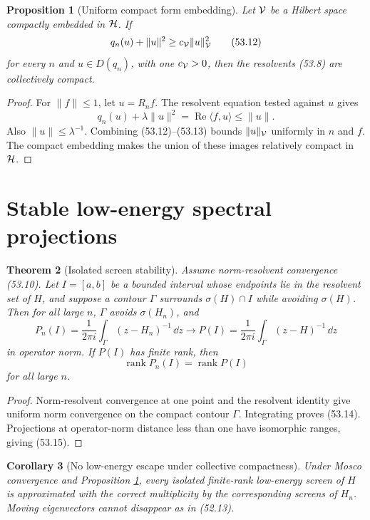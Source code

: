 \documentclass[11pt]{article}
\newtheorem{theorem}{Theorem}[section]
\newtheorem{proposition}[theorem]{Proposition}
\newtheorem{corollary}[theorem]{Corollary}
\theoremstyle{remark}
\begin{document}
\begin{proposition}[Uniform compact form embedding]
\label{prop:v15v53-compact-embedding}
Let \({\cal V}\) be a Hilbert space compactly embedded in
\({\cal H}\).  If
\[
 q_n(u)+\|u\|^2\geq c_{\cal V}\|u\|_{\cal V}^2          \tag{53.12}
\]
for every \(n\) and \(u\in D(q_n)\), with one
\(c_{\cal V}>0\), then the resolvents (53.8) are collectively
compact.
\end{proposition}

\begin{proof}
For \(\|f\|\leq1\), let \(u=R_nf\).  The resolvent equation tested
against \(u\) gives
\[
 q_n(u)+\lambda\|u\|^2
 =\operatorname{Re}\langle f,u\rangle
 \leq\|u\|.                                             \tag{53.13}
\]
Also \(\|u\|\leq\lambda^{-1}\).  Combining (53.12)--(53.13)
bounds \(\|u\|_{\cal V}\) uniformly in \(n\) and \(f\).
The compact embedding makes the union of these images relatively
compact in \({\cal H}\).
\end{proof}

\section{Stable low-energy spectral projections}

\begin{theorem}[Isolated screen stability]
\label{thm:v15v53-screen}
Assume norm-resolvent convergence (53.10).  Let
\(I=[a,b]\) be a bounded interval whose endpoints lie in the
resolvent set of \(H\), and suppose a contour \(\Gamma\) surrounds
\(\sigma(H)\cap I\) while avoiding \(\sigma(H)\).  Then for all
large \(n\), \(\Gamma\) avoids \(\sigma(H_n)\), and
\[
 P_n(I)=\frac1{2\pi i}\int_\Gamma(z-H_n)^{-1}\,\dd z
 \longrightarrow
 P(I)=\frac1{2\pi i}\int_\Gamma(z-H)^{-1}\,\dd z         \tag{53.14}
\]
in operator norm.  If \(P(I)\) has finite rank, then
\[
 \operatorname{rank}P_n(I)=\operatorname{rank}P(I)      \tag{53.15}
\]
for all large \(n\).
\end{theorem}

\begin{proof}
Norm-resolvent convergence at one point and the resolvent identity
give uniform norm convergence on the compact contour \(\Gamma\).
Integrating proves (53.14).  Projections at operator-norm distance
less than one have isomorphic ranges, giving (53.15).
\end{proof}

\begin{corollary}[No low-energy escape under collective compactness]
\label{cor:v15v53-no-escape}
Under Mosco convergence and Proposition
\ref{prop:v15v53-compact-embedding}, every isolated finite-rank
low-energy screen of \(H\) is approximated with the correct
multiplicity by the corresponding screens of \(H_n\).  Moving
eigenvectors cannot disappear as in (52.13).
\end{corollary}
\end{document}
